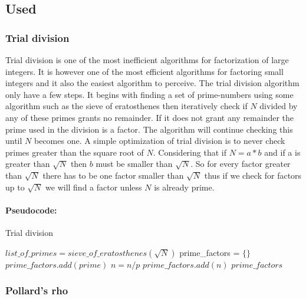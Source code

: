 \subsection{Used}

\subsubsection{Trial division}

Trial division is one of the most inefficient algorithms for factorization of large integers. It is however one of the most efficient algorithms for factoring small integers and it also the easiest algorithm to perceive.
The trial division algorithm only have a few steps. It begins with finding a set of prime-numbers using some algorithm such as the sieve of eratosthenes then iteratively check if \(N\) divided by any of these primes grants no remainder. If it does not grant any remainder the prime used in the division is a factor. The algorithm will continue checking this until \(N\) becomes one.
A simple optimization of trial division is to never check primes greater than the square root of \(N\). Considering that if \(N = a * b\) and if a is greater than \(\sqrt{N}\) then \(b\) must be smaller than \(\sqrt{N}\). So for every factor greater than \(\sqrt{N}\) there has to be one factor smaller than \(\sqrt{N}\) thus if we check for factors up to \(\sqrt{N}\) we will find a factor unless \(N\) is already prime.


\paragraph{Pseudocode:}

\textcolor{white}{ }

\begin{algorithm}
\caption{Trial division}
\begin{algorithmic}
	 	\State \Return
	\EndIf
	\State $list\_of\_primes = sieve\_of\_eratosthenes(\sqrt{N})$
	\State prime\_factors = $\{\}$
			\State $prime\_factors.add(prime)$
			\State $n = n / p$
		\EndWhile
	\EndFor
		\State \Return $prime\_factors.add(n)$
	\EndIf
	\State \Return $prime\_factors$
	\EndFunction
	\end{algorithmic}
\end{algorithm}


\subsubsection{Pollard’s rho}

